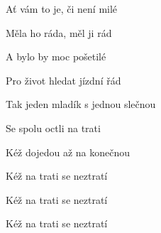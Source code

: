 \begin{song}
\bigskip

 Ať vám to je, či není milé  \par
{} Měla ho ráda, měl ji rád   \par
{} A bylo by moc pošetilé \par
{} Pro život hledat jízdní řád \par
{} Tak jeden mladík s jednou slečnou \par
{} Se spolu octli na trati  \par
{} Kéž dojedou až na konečnou  \par
{} Kéž na trati se neztratí \par
{} Kéž na trati se neztratí \par
{} Kéž na trati se neztratí \par

\end{song}
